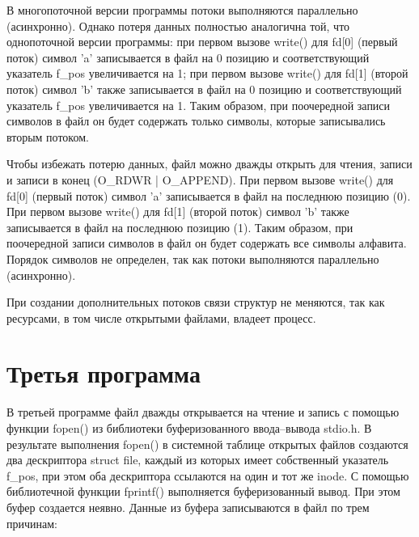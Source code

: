 

В многопоточной версии программы потоки выполняются параллельно (асинхронно).
Однако потеря данных полностью аналогична той, что однопоточной версии программы: при первом вызове write() для fd[0] (первый поток) символ 'a' записывается в файл на 0 позицию и соответствующий указатель f\_pos увеличивается на 1; при первом вызове write() для fd[1] (второй поток) символ 'b' также записывается в файл на 0 позицию и соответствующий указатель f\_pos увеличивается на 1.
Таким образом, при поочередной записи символов в файл он будет содержать только символы, которые записывались вторым потоком.

Чтобы избежать потерю данных, файл можно дважды открыть для чтения, записи и записи в конец (O\_RDWR | O\_APPEND).
При первом вызове write() для fd[0] (первый поток) символ 'a' записывается в файл на последнюю позицию (0).
При первом вызове write() для fd[1] (второй поток) символ 'b' также записывается в файл на последнюю позицию (1).
Таким образом, при поочередной записи символов в файл он будет содержать все символы алфавита.
Порядок символов не определен, так как потоки выполняются параллельно (асинхронно).

При создании дополнительных потоков связи структур не меняются, так как ресурсами, в том числе открытыми файлами, владеет процесс.

\clearpage

\section{Третья программа}



В третьей программе файл дважды открывается на чтение и запись с помощью функции fopen() из библиотеки буферизованного ввода--вывода stdio.h.
В результате выполнения fopen() в системной таблице открытых файлов создаются два дескриптора struct file, каждый из которых имеет собственный указатель f\_pos, при этом оба дескриптора ссылаются на один и тот же inode.
С помощью библиотечной функции fprintf() выполняется буферизованный вывод.
При этом буфер создается неявно.
Данные из буфера записываются в файл по трем причинам:

